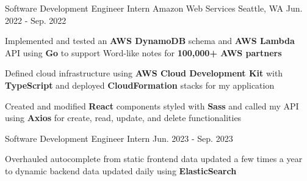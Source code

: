 

\begin{cventries}
  \cvtwoentry
    {Software Development Engineer Intern} %
    {Amazon Web Services} %
    {Seattle, WA} %
    {Jun. 2022 - Sep. 2022} %
    {
      \begin{cvitems} %
        \item {Implemented and tested an \textbf{AWS DynamoDB} schema and \textbf{AWS Lambda} API using \textbf{Go} to support Word-like notes for \textbf{100,000+ AWS partners} }
        \item {Defined cloud infrastructure using \textbf{AWS Cloud Development Kit} with \textbf{TypeScript} and deployed \textbf{CloudFormation} stacks for my application}
        \item {Created and modified \textbf{React} components styled with \textbf{Sass} and called my API using \textbf{Axios} for create, read, update, and delete functionalities} 
      \end{cvitems}
    }
    {Software Development Engineer Intern}
    {Jun. 2023 - Sep. 2023}
    {
      \begin{cvitems}
        \item {Overhauled autocomplete from static frontend data updated a few times a year to dynamic backend data updated daily using \textbf{ElasticSearch}}
      \end{cvitems}
    }


\end{cventries}
